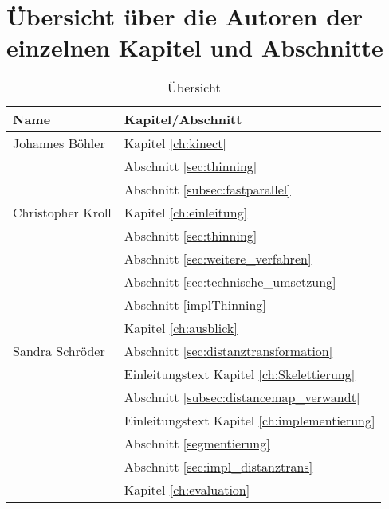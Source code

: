 \chapter{Übersicht über die Autoren der einzelnen Kapitel und Abschnitte}
\begin{table}[htbp]
\begin{center}
\begin{tabular}{|l|l|}
\hline 
\textbf{Name} & \textbf{Kapitel/Abschnitt}\\
\hline Johannes Böhler & Kapitel \ref{ch:kinect}\\
 & Abschnitt \ref{sec:thinning}\\
 & Abschnitt \ref{subsec:fastparallel} \\ 
\hline Christopher Kroll &  Kapitel \ref{ch:einleitung} \\
&  Abschnitt \ref{sec:thinning} \\
&  Abschnitt \ref{sec:weitere_verfahren} \\
&  Abschnitt \ref{sec:technische_umsetzung} \\
&  Abschnitt \ref{implThinning} \\ 
&  Kapitel \ref{ch:ausblick} \\
\hline Sandra Schröder &  Abschnitt \ref{sec:distanztransformation}\\
& Einleitungstext Kapitel \ref{ch:Skelettierung} \\
&  Abschnitt \ref{subsec:distancemap_verwandt} \\
& Einleitungstext Kapitel \ref{ch:implementierung}\\
& Abschnitt \ref{segmentierung}\\
& Abschnitt \ref{sec:impl_distanztrans} \\
& Kapitel \ref{ch:evaluation} \\
\hline
\end{tabular} 
\end{center}
\caption{Übersicht}
\end{table}